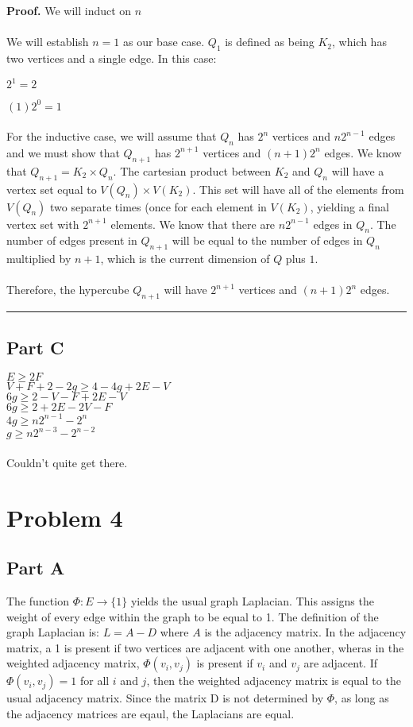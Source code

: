 \documentclass{article}%
\newenvironment{proof}[1][Proof]{\noindent\textbf{#1.} }{\ \rule{0.5em}{0.5em}}
\begin{document}
\begin{proof}
    We will induct on $n$\\ \\
    We will establish $n=1$ as our base case. $Q_1$ is defined as being $K_2$, which has two vertices and a single edge. In this case:

    $2^1 = 2$ \checkmark

    $(1)2^0 = 1$ \checkmark \\ \\
    For the inductive case, we will assume that $Q_n$ has $2^n$ vertices and $n2^{n-1}$ edges and we must show that $Q_{n+1}$ has $2^{n+1}$ vertices and $(n+1)2^n$ edges. We know that $Q_{n+1} = K_2 \times Q_n$. The cartesian product between $K_2$ and $Q_n$ will have a vertex set equal to $V(Q_n) \times V(K_2)$. This set will have all of the elements from $V(Q_n)$ two separate times (once for each element in $V(K_2)$, yielding a final vertex set with $2^{n+1}$ elements. We know that there are $n2^{n-1}$ edges in $Q_n$. The number of edges present in $Q_{n+1}$ will be equal to the number of edges in $Q_n$ multiplied by $n + 1$, which is the current dimension of $Q$ plus $1$.\\ \\
    Therefore, the hypercube $Q_{n+1}$ will have $2^{n+1}$ vertices and $(n+1)2^n$ edges.
\end{proof}

\subsection{Part C}

$E \geq 2F$ \\
$V + F + 2 -2g \geq 4 - 4g + 2E - V$ \\
$6g \geq 2 - V - F + 2E - V$ \\
$6g \geq 2 + 2E - 2V - F$ \\
$4g \geq n2^{n-1} - 2^n$ \\
$g \geq n2^{n-3} - 2^{n-2}$ \\ \\
Couldn't quite get there.

\section{Problem 4}

\subsection{Part A}
The function $\Phi:E \to \{1\}$ yields the usual graph Laplacian. This assigns the weight of every edge within the graph to be equal to 1. The definition of the graph Laplacian is: $L = A - D$ where $A$ is the adjacency matrix. In the adjacency matrix, a 1 is present if two vertices are adjacent with one another, wheras in the weighted adjacency matrix, $\Phi(v_i, v_j)$ is present if $v_i$ and $v_j$ are adjacent. If $\Phi(v_i, v_j) = 1$ for all $i$ and $j$, then the weighted adjacency matrix is equal to the usual adjacency matrix. Since the matrix D is not determined by $\Phi$, as long as the adjacency matrices are eqaul, the Laplacians are equal.
\end{document}
